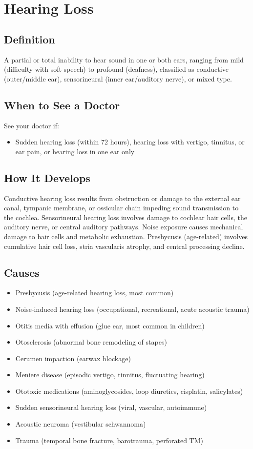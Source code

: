\chapter{Hearing Loss}

\section*{Definition}
A partial or total inability to hear sound in one or both ears, ranging from mild (difficulty with soft speech) to profound (deafness), classified as conductive (outer/middle ear), sensorineural (inner ear/auditory nerve), or mixed type.

\section*{When to See a Doctor}
See your doctor if:
\begin{itemize}
  \item Sudden hearing loss (within 72 hours), hearing loss with vertigo, tinnitus, or ear pain, or hearing loss in one ear only
\end{itemize}

\section*{How It Develops}
Conductive hearing loss results from obstruction or damage to the external ear canal, tympanic membrane, or ossicular chain impeding sound transmission to the cochlea. Sensorineural hearing loss involves damage to cochlear hair cells, the auditory nerve, or central auditory pathways. Noise exposure causes mechanical damage to hair cells and metabolic exhaustion. Presbycusis (age-related) involves cumulative hair cell loss, stria vascularis atrophy, and central processing decline.

\section*{Causes}
\begin{itemize}
  \item Presbycusis (age-related hearing loss, most common)
  \item Noise-induced hearing loss (occupational, recreational, acute acoustic trauma)
  \item Otitis media with effusion (glue ear, most common in children)
  \item Otosclerosis (abnormal bone remodeling of stapes)
  \item Cerumen impaction (earwax blockage)
  \item Meniere disease (episodic vertigo, tinnitus, fluctuating hearing)
  \item Ototoxic medications (aminoglycosides, loop diuretics, cisplatin, salicylates)
  \item Sudden sensorineural hearing loss (viral, vascular, autoimmune)
  \item Acoustic neuroma (vestibular schwannoma)
  \item Trauma (temporal bone fracture, barotrauma, perforated TM)
\end{itemize}

